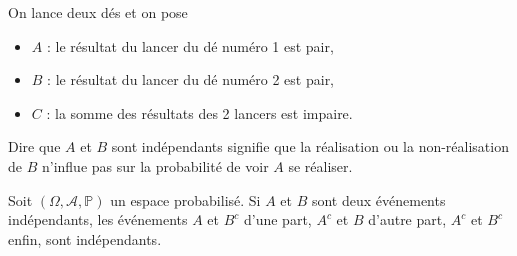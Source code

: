 \sld{\vfill\pagebreak[5]}%


\begin{exemple}
On lance deux dés et on pose
\begin{itemize}
	\item	$A$ : le résultat du lancer du dé numéro 1 est pair,
	\item	$B$ : le résultat du lancer du dé numéro 2 est pair,
	\item	$C$ : la somme des résultats des 2 lancers est impaire.
\end{itemize}
\pl{\rep{6cm}}
\end{exemple}


Dire que $A$ et $B$ sont indépendants signifie que la réalisation ou la non-réalisation de $B$ n'influe pas sur la probabilité de voir $A$ se réaliser. %

\begin{proposition}
Soit $(\Omega,\mathcal{A},\mathbb{P})$ un espace probabilisé. Si $A$ et $B$ sont deux événements indépendants, les événements $A$ et $B^c$ d'une part, $A^c$ et $B$ d'autre part, $A^c$ et $B^c$ enfin, sont indépendants.
\end{proposition}

